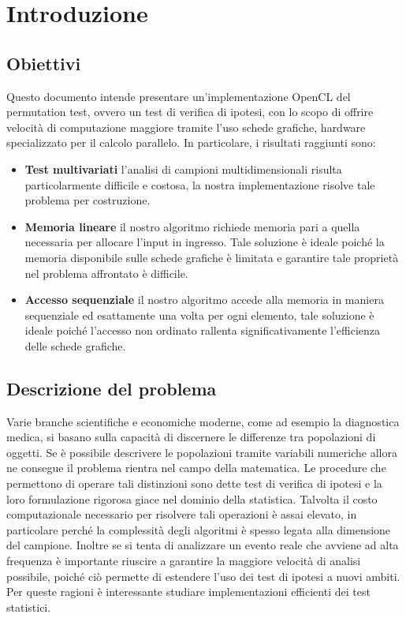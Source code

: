\section{Introduzione}


\subsection{Obiettivi}
Questo documento intende presentare un'implementazione OpenCL del permutation test, ovvero un test di verifica di ipotesi,  con lo scopo di offrire velocità di computazione maggiore tramite l'uso schede grafiche, hardware specializzato per il calcolo parallelo. 
In particolare, i risultati raggiunti sono:
\begin{itemize}
	\item \textbf{Test multivariati} l'analisi di campioni multidimensionali risulta particolarmente difficile e costosa, la nostra implementazione risolve tale problema per costruzione.
	\item \textbf{Memoria lineare} il nostro algoritmo richiede memoria pari a quella necessaria per allocare l'input in ingresso. Tale soluzione è ideale poiché la memoria disponibile sulle schede grafiche è limitata e garantire tale proprietà nel problema affrontato è difficile.
	\item \textbf{Accesso sequenziale} il nostro algoritmo accede alla memoria in maniera sequenziale ed esattamente una volta per ogni elemento, tale soluzione è ideale poiché l'accesso non ordinato rallenta significativamente l'efficienza delle schede grafiche.
\end{itemize}


\subsection{Descrizione del problema}
Varie branche scientifiche e economiche moderne, come ad esempio la diagnostica medica, si basano sulla capacità di discernere le differenze tra popolazioni di oggetti. Se è possibile descrivere le popolazioni tramite variabili numeriche allora ne consegue il problema rientra nel campo della matematica.
Le procedure che permettono di operare tali distinzioni sono dette test di verifica di ipotesi e la loro formulazione rigorosa giace nel dominio della statistica.
Talvolta il costo computazionale necessario per risolvere tali operazioni è assai elevato, in particolare perché la complessità degli algoritmi è spesso legata alla dimensione del campione. Inoltre se si tenta di analizzare un evento reale che avviene ad alta frequenza è importante riuscire a garantire la maggiore velocità di analisi possibile, poiché ciò permette di estendere l'uso dei test di ipotesi a nuovi ambiti.
Per queste ragioni è interessante studiare implementazioni efficienti dei test statistici.

